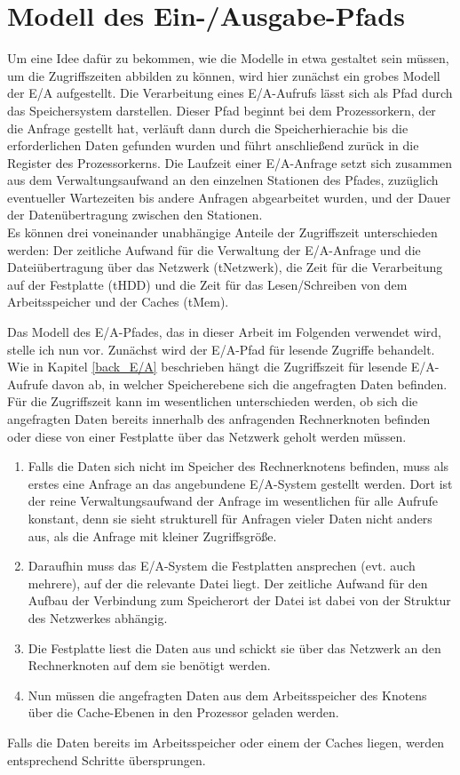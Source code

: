 \documentclass[
	12pt,
	a4paper,
	BCOR10mm,
	DIV14,
	listof=totoc,
	bibliography=totoc,
	headsepline
]{scrreprt}
\begin{document}
\section{Modell des Ein-/Ausgabe-Pfads}
\label{analyse:ea_modell}
Um eine Idee dafür zu bekommen, wie die Modelle in etwa gestaltet sein müssen, um die Zugriffszeiten abbilden zu können, wird hier zunächst ein grobes Modell der E/A aufgestellt.
Die Verarbeitung eines E/A-Aufrufs lässt sich als Pfad durch das Speichersystem darstellen.
Dieser Pfad beginnt bei dem Prozessorkern, der die Anfrage gestellt hat, verläuft dann durch die Speicherhierachie bis die erforderlichen Daten gefunden wurden und führt anschließend zurück in die Register des Prozessorkerns.
Die Laufzeit einer E/A-Anfrage setzt sich zusammen aus dem Verwaltungsaufwand an den einzelnen Stationen des Pfades, zuzüglich eventueller Wartezeiten bis andere Anfragen abgearbeitet wurden, und der Dauer der Datenübertragung zwischen den Stationen.\\
Es können drei voneinander unabhängige Anteile der Zugriffszeit unterschieden werden:
Der zeitliche Aufwand für die Verwaltung der E/A-Anfrage und die Dateiübertragung über das Netzwerk (tNetzwerk), die Zeit für die Verarbeitung auf der Festplatte (tHDD) und die Zeit für das Lesen/Schreiben von dem Arbeitsspeicher und der Caches (tMem).\medskip

Das Modell des E/A-Pfades, das in dieser Arbeit im Folgenden verwendet wird, stelle ich nun vor. Zunächst wird der E/A-Pfad für lesende Zugriffe behandelt.
Wie in Kapitel \ref{back_E/A} beschrieben hängt die Zugriffszeit für lesende E/A-Aufrufe davon ab, in welcher Speicherebene sich die angefragten Daten befinden.
Für die Zugriffszeit kann im wesentlichen unterschieden werden, ob sich die angefragten Daten bereits innerhalb des anfragenden Rechnerknoten befinden oder diese von einer Festplatte über das Netzwerk geholt werden müssen.

\begin{enumerate}
\item Falls die Daten sich nicht im Speicher des Rechnerknotens befinden, muss als erstes eine Anfrage an das angebundene E/A-System gestellt werden.
Dort ist der reine Verwaltungsaufwand der Anfrage im wesentlichen für alle Aufrufe konstant, denn sie sieht strukturell für Anfragen vieler Daten nicht anders aus, als die Anfrage mit kleiner Zugriffsgröße.
\item Daraufhin muss das E/A-System die Festplatten ansprechen (evt. auch mehrere), auf der die relevante Datei liegt. Der zeitliche Aufwand für den Aufbau der Verbindung zum Speicherort der Datei ist dabei von der Struktur des Netzwerkes abhängig.
\item Die Festplatte liest die Daten aus und schickt sie über das Netzwerk an den Rechnerknoten auf dem sie benötigt werden.
\item Nun müssen die angefragten Daten aus dem Arbeitsspeicher des Knotens über die Cache-Ebenen in den Prozessor geladen werden. 
\end{enumerate}
Falls die Daten bereits im Arbeitsspeicher oder einem der Caches liegen, werden entsprechend Schritte übersprungen.
\end{document}
